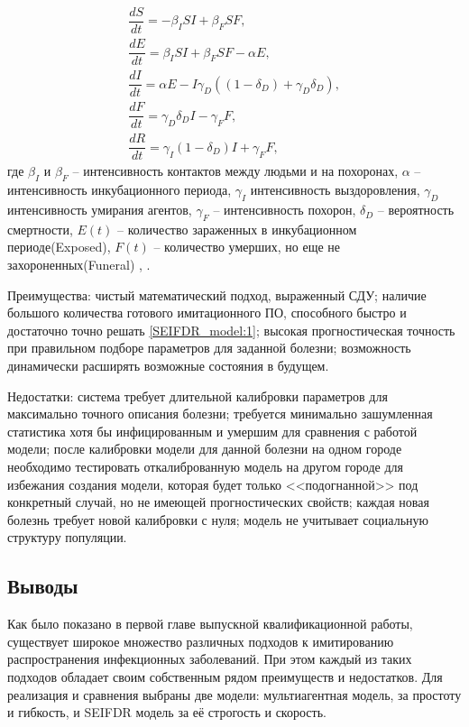 \begin{gather} 
\nonumber	\dfrac{dS}{dt} = -\beta_I S I + \beta_F S F, \\
\nonumber	\dfrac{dE}{dt} = \beta_I S I + \beta_F S F - \alpha E, \\
	\dfrac{dI}{dt} = \alpha E - I \gamma_D ( (1 - \delta_D) + \gamma_D \delta_D), \label{SEIFDR_model:1} \\
\nonumber	\dfrac{dF}{dt} = \gamma_D \delta_D I - \gamma_F F, \\
\nonumber	\dfrac{dR}{dt} = \gamma_I(1-\delta_D) I + \gamma_F F, 
\end{gather}
где $\beta_I$ и $\beta_F$ -- интенсивность контактов между людьми и на похоронах, $\alpha$ --  интенсивность инкубационного периода, $\gamma_I$ интенсивность выздоровления, $\gamma_D$  интенсивность умирания агентов, $\gamma_F$ --   интенсивность похорон, $\delta_D$ -- вероятность смертности, $ E(t) $ -- количество зараженных в инкубационном периоде(Exposed), $ F(t) $ -- количество умерших, но еще не захороненных(Funeral) %
\cite{Plos_Outbreak:1}, \cite{Plos_Outbreak:2}. 


Преимущества: чистый математический подход, выраженный СДУ; наличие большого количества готового имитационного ПО, способного быстро и достаточно точно решать \eqref{SEIFDR_model:1}; высокая прогностическая точность при правильном подборе параметров для заданной болезни; возможность динамически расширять возможные состояния в будущем.

Недостатки: система требует длительной калибровки параметров для максимально точного описания болезни; требуется минимально зашумленная статистика хотя бы инфицированным и умершим для сравнения с работой модели; после калибровки модели для данной болезни на одном городе необходимо тестировать откалиброванную модель на другом городе для избежания создания модели, которая будет только <<подогнанной>> под конкретный случай, но не имеющей прогностических свойств; каждая новая болезнь требует новой калибровки с нуля; модель не учитывает социальную структуру популяции.

\subsection{Выводы}
Как было показано в первой главе выпускной квалификационной работы, существует широкое множество различных подходов к имитированию распространения инфекционных заболеваний. При этом каждый из таких подходов обладает своим собственным рядом преимуществ и недостатков. Для реализация и сравнения выбраны две модели: мультиагентная модель, за простоту и гибкость, и SEIFDR модель за её строгость и скорость.